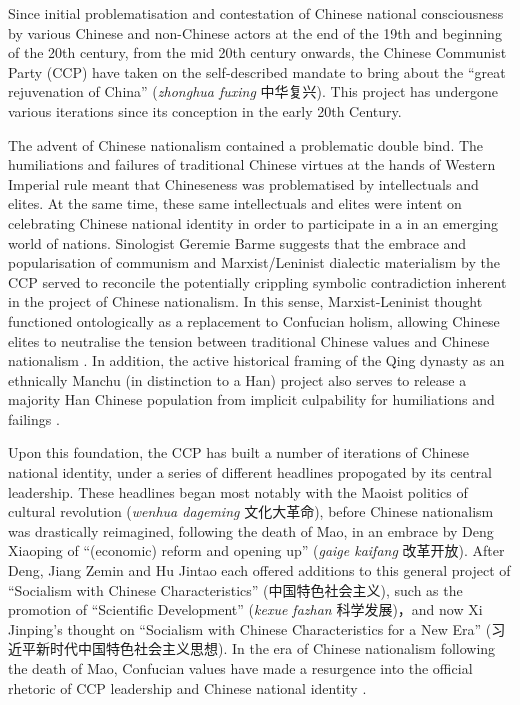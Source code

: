 \begin{CJK}{UTF8}{gbsn}
Since initial problematisation and contestation of Chinese national consciousness by various Chinese and non-Chinese actors at the end of the 19th and beginning of the 20th century, from the mid 20th century onwards, the Chinese Communist Party (CCP) have taken on the self-described mandate to bring about the ``great rejuvenation of China'' (\textit{zhonghua fuxing} 中华复兴).  This project has undergone various iterations since its conception in the early 20th Century.

The advent of Chinese nationalism contained a problematic double bind.
The humiliations and failures of traditional Chinese virtues at the hands of Western Imperial rule meant that Chineseness was problematised by intellectuals and elites.  At the same time, these same intellectuals and elites were intent on celebrating Chinese national identity in order to participate in a in an emerging world of nations.  Sinologist Geremie Barme suggests that the embrace and popularisation of communism and Marxist/Leninist dialectic materialism by the CCP served to reconcile the potentially crippling symbolic contradiction inherent in the project of Chinese nationalism. In this sense, Marxist-Leninist thought functioned ontologically as a replacement to Confucian holism, allowing Chinese elites to neutralise the tension between traditional Chinese values and Chinese nationalism \citep{Barme2009}.  In addition, the active historical framing of the Qing dynasty as an ethnically Manchu (in distinction to a Han) project also serves to release a majority Han Chinese population from implicit culpability for humiliations and failings \citep{Barme2015a}.

Upon this foundation, the CCP has built a number of iterations of Chinese national identity, under a series of different headlines propogated by its central leadership. These headlines began most notably with the Maoist politics of cultural revolution (\textit{wenhua dageming} 文化大革命), before Chinese nationalism was drastically reimagined, following the death of Mao, in an embrace by Deng Xiaoping of ``(economic) reform and opening up'' (\textit{gaige kaifang} 改革开放).  After Deng, Jiang Zemin and Hu Jintao each offered additions to this general project of ``Socialism with Chinese Characteristics'' (中国特色社会主义), such as the promotion of ``Scientific Development'' (\textit{kexue fazhan} 科学发展)，and now Xi Jinping's thought on ``Socialism with Chinese Characteristics for a New Era'' (习近平新时代中国特色社会主义思想). In the era of Chinese nationalism following the death of Mao, Confucian values have made a resurgence into the official rhetoric of CCP leadership and Chinese national identity \citep{Billioud2007}.



\end{CJK}
